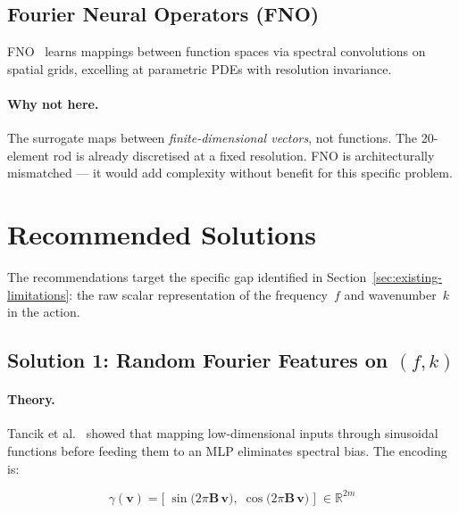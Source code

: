 \documentclass[11pt]{article}
\newcommand{\vect}[1]{\mathbf{#1}}
\newcommand{\mat}[1]{\mathbf{#1}}
\newcommand{\Real}{\mathbb{R}}
\begin{document}
\subsection{Fourier Neural Operators (FNO)}

FNO~\cite{li2021fno} learns mappings between function spaces via spectral
convolutions on spatial grids, excelling at parametric PDEs with resolution invariance.

\paragraph{Why not here.}
The surrogate maps between \emph{finite-dimensional vectors}, not functions.
The 20-element rod is already discretised at a fixed resolution.
FNO is architecturally mismatched --- it would add complexity without benefit for
this specific problem.

\section{Recommended Solutions}
\label{sec:solutions}

The recommendations target the specific gap identified in
Section~\ref{sec:existing-limitations}: the raw scalar representation of the
frequency~$f$ and wavenumber~$k$ in the action.

\subsection{Solution 1: Random Fourier Features on $(f, k)$}
\label{sec:rff}

\paragraph{Theory.}
Tancik et al.~\cite{tancik2020fourier} showed that mapping low-dimensional inputs
through sinusoidal functions before feeding them to an MLP eliminates spectral bias.
The encoding is:

\begin{equation}
  \gamma(\vect{v}) =
  \bigl[\;
    \sin\!\bigl(2\pi \mat{B}\,\vect{v}\bigr),\;
    \cos\!\bigl(2\pi \mat{B}\,\vect{v}\bigr)
  \;\bigr]
  \;\in \Real^{2m}
  \label{eq:rff}
\end{equation}
\end{document}

